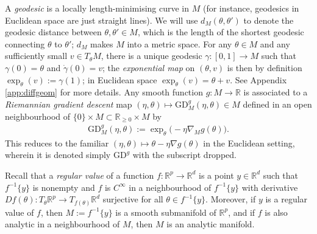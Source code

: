 \documentclass{article}
\newcommand{\RB}{\mathbb{R}}
\newcommand{\GD}{\mathrm{GD}}
\theoremstyle{plain}
\theoremstyle{definition}
\newtheorem{definition}[theorem]{Definition}
\theoremstyle{remark}
\begin{document}
A \emph{geodesic} is a locally length-minimising curve in $M$ (for instance, geodesics in Euclidean space are just straight lines). We will use $d_M(\theta,\theta')$ to denote the geodesic distance between $\theta,\theta'\in M$, which is the length of the shortest geodesic connecting $\theta$ to $\theta'$; $d_M$ makes $M$ into a metric space. For any $\theta\in M$ and any sufficiently small $v\in T_{\theta}M$, there is a unique geodesic $\gamma:[0,1]\rightarrow M$ such that $\gamma(0)=\theta$ and $\dot{\gamma}(0)=v$; the \emph{exponential map} on $(\theta,v)$ is then by definition $\exp_{\theta}(v):=\gamma(1)$; in Euclidean space $\exp_{\theta}(v) =\theta+v$. See Appendix \ref{app:diffgeom} for more details. Any smooth function $g:M\rightarrow\RB$ is associated to a \emph{Riemannian gradient descent} map $(\eta,\theta)\mapsto \GD_M^{g}(\eta,\theta)\in M$ defined in an open neighbourhood of $\{0\}\times M\subset \RB_{\geq0}\times M$ by
\begin{align}
    \GD_M^g(\eta,\theta):=\exp_{\theta}\big(-\eta\nabla_Mg(\theta)\big).\label{eq:rgd}
\end{align}
This reduces to the familiar $(\eta,\theta)\mapsto \theta-\eta\nabla g(\theta)$ in the Euclidean setting, wherein it is denoted simply $\GD^g$ with the subscript dropped.

Recall that a \emph{regular value} of a function $f:\RB^p\rightarrow\RB^d$ is a point $y\in\RB^d$ such that $f^{-1}\{y\}$ is nonempty and $f$ is $C^{\infty}$ in a neighbourhood of $f^{-1}\{y\}$ with derivative $Df(\theta):T_{\theta}\RB^p\rightarrow T_{f(\theta)}\RB^d$ surjective for all $\theta\in f^{-1}\{y\}$. Moreover, if $y$ is a regular value of $f$, then $M:=f^{-1}\{y\}$ is a smooth submanifold of $\RB^p$, and if $f$ is also analytic in a neighbourhood of $M$, then $M$ is an analytic manifold.



\end{document}
